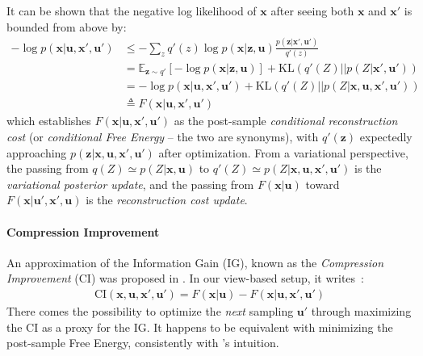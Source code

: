 \documentclass[12pt,twoside,openright]{article}
\begin{document}
It can be shown that the negative log likelihood of $\boldsymbol{x}$ after seeing both $\boldsymbol{x}$ and $\boldsymbol{x}'$ is  bounded from above by:
\begin{align}
	-\log p(\boldsymbol{x}| \boldsymbol{u}, \boldsymbol{x}', \boldsymbol{u}') 
	&\leq - \sum_z q'(z) \log p(\boldsymbol{x}| \boldsymbol{z}, \boldsymbol{u}) \frac{p(\boldsymbol{z} |\boldsymbol{x}', \boldsymbol{u}')} {q'(z)}  \nonumber\\
	&= \mathbb{E}_{\boldsymbol{z} \sim q'} \left[-\log p(\boldsymbol{x}| \boldsymbol{z}, \boldsymbol{u})\right] + \text{KL}(q'(Z)||p(Z|\boldsymbol{x}',\boldsymbol{u}'))
	\label{eq:FEP-uxu}\\
	&=  -\log p(\boldsymbol{x}| \boldsymbol{u}, \boldsymbol{x}',\boldsymbol{u}') + \text{KL}(q'(Z)||p(Z|\boldsymbol{x},\boldsymbol{u},\boldsymbol{x}',\boldsymbol{u}'))
	\label{eq:FEP-uxu2}\\
	&\triangleq F(\boldsymbol{x}|\boldsymbol{u}, \boldsymbol{x}', \boldsymbol{u}')\nonumber
\end{align}
which establishes $F(\boldsymbol{x}|\boldsymbol{u}, \boldsymbol{x}', \boldsymbol{u}')$ as the post-sample \emph{conditional reconstruction cost} (or \emph{conditional Free Energy} -- the two are synonyms), with $q'(\boldsymbol{z})$ expectedly approaching  $p(\boldsymbol{z}|\boldsymbol{x}, \boldsymbol{u}, \boldsymbol{x}', \boldsymbol{u}')$ after optimization.
From a variational perspective, the passing from $q(Z) \simeq p(Z|\boldsymbol{x}, \boldsymbol{u})$ to $q'(Z) \simeq p(Z|\boldsymbol{x}, \boldsymbol{u}, \boldsymbol{x}', \boldsymbol{u}')$ is the \emph{variational posterior update}, and the passing from $F(\boldsymbol{x}|\boldsymbol{u})$ toward   $F(\boldsymbol{x}|\boldsymbol{u}', \boldsymbol{x}', \boldsymbol{u})$ is the \emph{reconstruction cost update}. 

\paragraph{Compression Improvement}
An approximation of the Information Gain (IG), known as the \emph{Compression Improvement} (CI) was proposed in \citet{schmidhuber2007simple,houthooft2016vime}. In our view-based setup, it
writes~:
\begin{align}
	\text{CI}(\boldsymbol{x},\boldsymbol{u}, \boldsymbol{x}', \boldsymbol{u}') = F(\boldsymbol{x}|\boldsymbol{u}) - F(\boldsymbol{x}|\boldsymbol{u}, \boldsymbol{x}', \boldsymbol{u}') \label{eq:CI-base}
\end{align}	
There comes the possibility to  optimize the \emph{next} sampling $\boldsymbol{u}'$ through maximizing the CI as a proxy for the IG. It happens 
	to be equivalent with minimizing the post-sample Free Energy, consistently with \citet{friston2012perceptions}'s intuition.
\end{document}
